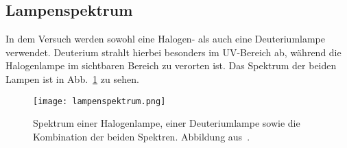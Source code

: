 \subsection{\label{subsec:FZV7}Lampenspektrum}
In dem Versuch werden sowohl eine Halogen- als auch eine Deuteriumlampe verwendet. Deuterium strahlt hierbei besonders im UV-Bereich ab, während die Halogenlampe im sichtbaren Bereich zu verorten ist. Das Spektrum der beiden Lampen ist in Abb.~\ref{fig:lampenspektrum} zu sehen.

\begin{figure}
    \centering
    \texttt{[image: lampenspektrum.png]}
    \caption{Spektrum einer Halogenlampe, einer Deuteriumlampe sowie die Kombination der beiden Spektren. Abbildung aus~\cite[]{deuthal}.}
    \label{fig:lampenspektrum}
\end{figure}